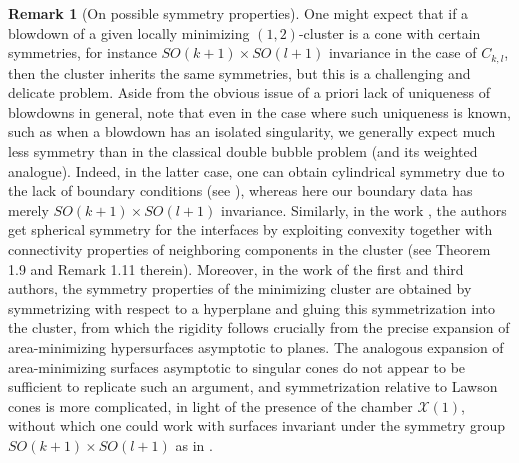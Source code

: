 \documentclass[10pt,reqno]{amsart}
\numberwithin{equation}{section}
\theoremstyle{definition}
\newtheorem{remark}[theorem]{Remark}
\newcommand{\X}{\mathcal{X}}
\begin{document}
\begin{remark}[On possible symmetry properties]\label{remark:symmetries}
{One might expect that if a blowdown of a given locally minimizing $(1,2)$-cluster is a cone with certain symmetries, for instance $SO(k+1)\times SO(l+1)$ invariance in the case of $C_{k,l}$, then the cluster inherits the same symmetries, but this is a challenging and delicate problem. Aside from the obvious issue of a priori lack of uniqueness of blowdowns in general, note that even in the case where such uniqueness is known, such as when a blowdown has an isolated singularity, we generally expect much less symmetry than in the classical double bubble problem (and its weighted analogue). Indeed, in the latter case, one can obtain cylindrical symmetry due to the lack of boundary conditions (see \cite{Hut97}), whereas here our boundary data has merely $SO(k+1)\times SO(l+1)$ invariance. Similarly, in the work \cite{MilNee22}, the authors get spherical symmetry for the interfaces by exploiting convexity together with connectivity properties of neighboring components in the cluster (see Theorem 1.9 and Remark 1.11 therein). Moreover, in the work \cite{BroNov24} of the first and third authors, the symmetry properties of the minimizing cluster are obtained by symmetrizing with respect to a hyperplane and gluing this symmetrization into the cluster, from which the rigidity follows crucially from the precise expansion of area-minimizing hypersurfaces asymptotic to planes. The analogous expansion of area-minimizing surfaces asymptotic to singular cones do not appear to be sufficient to replicate such an argument, and symmetrization relative to Lawson cones is more complicated, in light of the presence of the chamber $\X(1)$, without which one could work with surfaces invariant under the symmetry group $SO(k+1)\times SO(l+1)$ as in \cite{Lawson72}.}
\end{remark}
\end{document}
